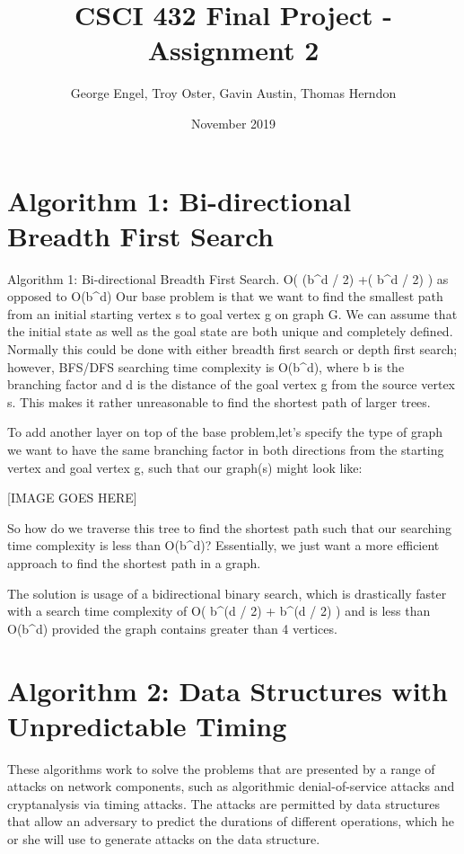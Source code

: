 \documentclass{article}
\title{CSCI 432 Final Project - Assignment 2}
\author{George Engel, Troy Oster, Gavin Austin, Thomas Herndon}
\date{November 2019}
\begin{document}
\maketitle

\section{Algorithm 1: Bi-directional Breadth First Search}

    Algorithm 1: Bi-directional Breadth First Search. O( (b^d / 2) +( b^d / 2) ) as opposed to O(b^d)
Our base problem is that we want to find the smallest path from an initial starting vertex s to goal vertex g on graph G. We can assume that the initial state as well as the goal state are both unique and completely defined. Normally this could be done with either breadth first search or depth first search; however, BFS/DFS searching time complexity is O(b^d), where b is the branching factor and d is the distance of the goal vertex g from the source vertex s. This makes it rather unreasonable to find the shortest path of larger trees.

    To add another layer on top of the base problem,let’s specify the type of graph we want to have the same branching factor in both directions from the starting vertex and goal vertex g, such that our graph(s) might look like:

[IMAGE GOES HERE]

    So how do we traverse this tree to find the shortest path such that our searching time complexity is less than O(b^d)? Essentially, we just want a more efficient approach to find the shortest path in a graph. 

    The solution is usage of a bidirectional binary search, which is drastically faster with a search time complexity of O( b^(d / 2) + b^(d / 2) ) and is less than O(b^d) provided the graph contains greater than 4 vertices. 

\section{Algorithm 2: Data Structures with Unpredictable Timing}

    These algorithms work to solve the problems that are presented by a range of attacks on network components, such as algorithmic denial-of-service attacks and cryptanalysis via timing attacks. The attacks are permitted by data structures that allow an adversary to predict the durations of different operations, which he or she will use to generate attacks on the data structure.
\end{document}
